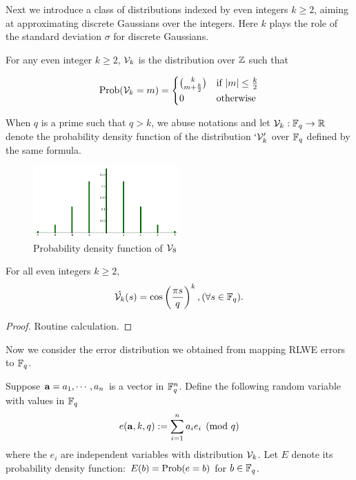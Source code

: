 \documentclass{amsart}
\begin{document}
Next we introduce a class of distributions indexed by even integers $k \geq 2$, aiming at approximating discrete Gaussians over the integers. Here $k$ plays the role of
the standard deviation $\sigma$ for discrete Gaussians.

\begin{Definition}
For any even integer $k \geq 2$, $\mathcal{V}_k$ is the distribution over $\mathbb{Z}$ such that

$$\operatorname{Prob}(\mathcal{V}_k = m) =  \begin{cases} {k}\choose{m+\frac{k}{2}} &\mbox{if } |m| \leq \frac{k}{2} \\
0 & \mbox{otherwise}  \end{cases}$$

\end{Definition}
When $q$ is a prime such that $q > k$, we abuse notations and let $\mathcal{V}_k: \mathbb{F}_q \to \mathbb{R}$ denote the probability density function of the distribution $`\mathcal{V}_k'$ over $\mathbb{F}_q$ defined by the same formula.

\begin{figure}[h!]
\centering
\includegraphics[width = 0.5\textwidth]{v8.png}
\caption{Probability density function of $\mathcal{V}_8$}
\end{figure}


\begin{Lemma}
For all even integers $k \geq 2$,
$$\hat{\mathcal{V}_k}(s)  = \cos \left(\frac{\pi s}{q}\right)^k, (\forall s \in \mathbb{F}_q).$$
\end{Lemma}

\begin{proof}
Routine calculation.
\end{proof}

Now we consider the error distribution we obtained from mapping RLWE errors to $\mathbb{F}_q$.

\begin{Definition}
Suppose ${\bf a} = a_1, \cdots ,a_n$ is a vector in $\mathbb{F}_q^n$. Define the following random variable with
values in $\mathbb{F}_q$
\[
    e({\bf a}, k, q) := \sum_{i=1}^n a_i e_i \pmod {q}
\]
where the $e_i$ are independent variables with distribution $\mathcal{V}_k$. Let $E$ denote its probability density function:
$E(b) = \operatorname{Prob}(e = b)$ for $b \in \mathbb{F}_q$.
\end{Definition}
\end{document}
